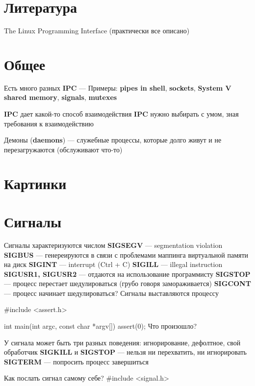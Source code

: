 
\section{Литература}
The Linux Programming Interface (практически все описано)

\section{Общее}
Есть много разных \textbf{IPC} --- 
Примеры: \textbf{pipes in shell}, \textbf{sockets}, \textbf{System V shared memory},
\textbf{signals}, \textbf{mutexes}

\textbf{IPC} дает какой-то способ взаимодействия
\textbf{IPC} нужно выбирать с умом, зная требования к взаимодействию

Демоны (\textbf{daemons}) --- служебные процессы, которые долго живут 
и не перезагружаются (обслуживают что-то)

\section{Картинки}

\section{Сигналы}
Сигналы характеризуются числом
\textbf{SIGSEGV} --- segmentation violation
\textbf{SIGBUS} --- генереируются в связи с проблемами маппинга виртуальной памяти на диск
\textbf{SIGINT} --- interrupt (Ctrl + C)
\textbf{SIGILL} --- illegal instruction
\textbf{SIGUSR1, SIGUSR2} --- отдаются на использование программисту
\textbf{SIGSTOP} --- процесс перестает шедулироваться (грубо говоря замораживается)
\textbf{SIGCONT} --- процесс начинает шедулироваться?
Сигналы выставляются процессу

#include <assert.h>

int main(int argc, const char *argv[]) {
    assert(0);
}
Что произошло?

У сигнала может быть три разных поведения: игнорирование, дефолтное, свой обработчик
\textbf{SIGKILL} и \textbf{SIGSTOP} --- нельзя ни перехватить, ни игнорировать
\textbf{SIGTERM} --- попросить процесс завершиться

Как послать сигнал самому себе?
#include <signal.h>

